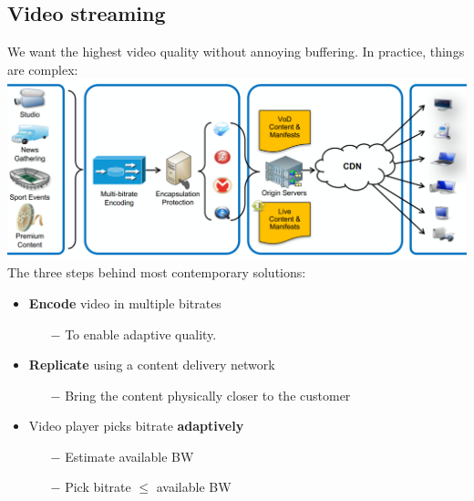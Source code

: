 \documentclass[a4paper, fontsize=8pt, landscape, DIV=1]{scrartcl}
\begin{document}
\begin{multicols*}{4}
		\subsection{Video streaming}
		We want the highest video quality without annoying buffering. In practice, things are complex:\\
		\includegraphics[width=\columnwidth]{images/Application_Layer/netflix_way.png}
		The three steps behind most contemporary solutions:
		\begin{itemize}[noitemsep]
			\item \textbf{Encode} video in multiple bitrates
			\begin{itemize}
				\item[$-$] To enable adaptive quality.
			\end{itemize}
			\item \textbf{Replicate} using a content delivery network
			\begin{itemize}
				\item[$-$] Bring the content physically closer to the customer
			\end{itemize}
			\item Video player picks bitrate \textbf{adaptively}
			\begin{itemize}
				\item[$-$] Estimate available BW
				\item[$-$] Pick bitrate $\le$ available BW
			\end{itemize}
		\end{itemize}
		

\end{multicols*}
\end{document}
